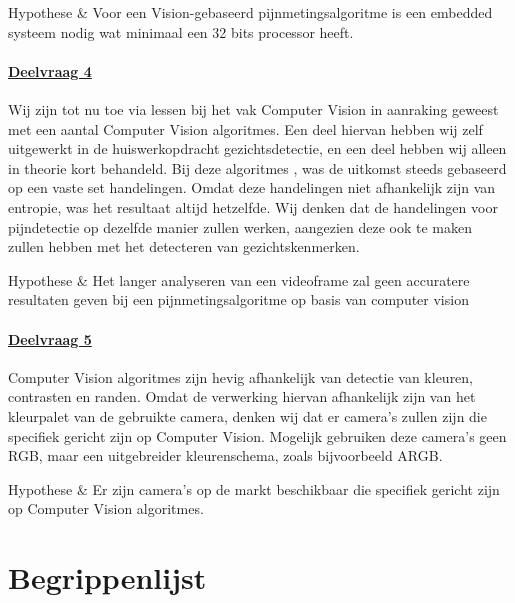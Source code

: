 \documentclass[11pt]{article}
\begin{document}
    \begin{definition}
        Hypothese & Voor een Vision-gebaseerd pijnmetingsalgoritme is een embedded systeem nodig wat minimaal een 32 bits processor heeft.
    \end{definition}

    \paragraph{\hyperref[itm:dv4]{Deelvraag 4}}
    Wij zijn tot nu toe via lessen bij het vak Computer Vision in aanraking geweest met een aantal Computer Vision algoritmes.
    Een deel hiervan hebben wij zelf uitgewerkt in de huiswerkopdracht gezichtsdetectie, en een deel hebben wij alleen in theorie kort behandeld.
    Bij deze algoritmes , was de uitkomst steeds gebaseerd op een vaste set handelingen.
    Omdat deze handelingen niet afhankelijk zijn van entropie, was het resultaat altijd hetzelfde.
    Wij denken dat de handelingen voor pijndetectie op dezelfde manier zullen werken, aangezien deze ook te maken zullen hebben met het detecteren van gezichtskenmerken.\\

    \begin{definition}
        Hypothese & Het langer analyseren van een videoframe zal geen accuratere resultaten geven bij een pijnmetingsalgoritme op basis van computer vision
    \end{definition}

    \paragraph{\hyperref[itm:dv5]{Deelvraag 5}}
    Computer Vision algoritmes zijn hevig afhankelijk van detectie van kleuren, contrasten en randen.
    Omdat de verwerking hiervan afhankelijk zijn van het kleurpalet van de gebruikte camera, denken wij dat er camera's zullen zijn die specifiek gericht zijn op Computer Vision.
    Mogelijk gebruiken deze camera's geen RGB, maar een uitgebreider kleurenschema, zoals bijvoorbeeld ARGB.\\

    \begin{definition}
        Hypothese & Er zijn camera's op de markt beschikbaar die specifiek gericht zijn op Computer Vision algoritmes.
    \end{definition}


    \section{Begrippenlijst}\label{sec:begrippenlijst}
\end{document}
